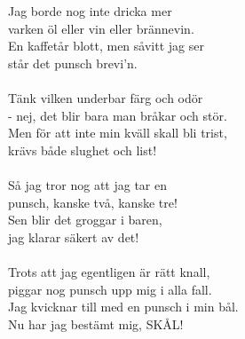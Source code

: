 {\footnotesize{}}\\
\\
Jag borde nog inte dricka mer\\
varken öl eller vin eller brännevin.\\
En kaffetår blott, men såvitt jag ser\\
står det punsch brevi'n.\\
\\
Tänk vilken underbar färg och odör \\
 - nej, det blir bara man bråkar och stör.\\
Men för att inte min kväll skall bli trist,\\
krävs både slughet och list!\\
\\
Så jag tror nog att jag tar en\\
punsch, kanske två, kanske tre!\\
Sen blir det groggar i baren,\\
jag klarar säkert av det!\\
\\
Trots att jag egentligen är rätt knall,\\
piggar nog punsch upp mig i alla fall.\\
Jag kvicknar till med en punsch i min bål.\\
Nu har jag bestämt mig, SKÅL!
